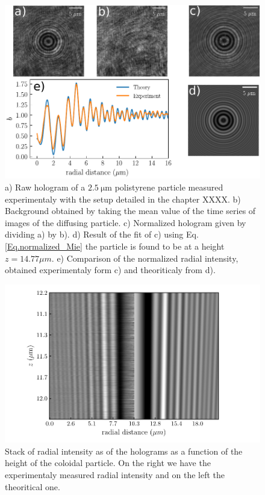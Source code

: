 \begin{figure}
	\centering
		\includegraphics[scale=0.8]{02_body/chapter2/images/lorenz_mie_fit_demo/plot_lorenz_mie.pdf}
		\caption{a) Raw hologram of a $2.5 ~ \mathrm{\mu m}$ polistyrene particle measured experimentaly with the setup detailed in the chapter XXXX. b) Background obtained by taking the mean value of the time series of images of the diffusing particle. c) Normalized hologram given by dividing a) by b). d) Result of the fit of c) using Eq.{\ref{Eq.normalized_Mie}} the particle is found to be at a height $z = 14.77 \mu m$. e) Comparison of the normalized radial intensity, obtained experimentaly form c) and theoriticaly from d).}
		\label{fig.Lorenz_mie_demo}
\end{figure}


\begin{figure}
	\centering
	\includegraphics{02_body/chapter2/images/test_tableau2.pdf}
	\caption{Stack of radial intensity as of the holograms as a function of the height of the coloidal particle. On the right we have the experimentaly measured radial intensity and on the left the theoritical one.}
\end{figure}


